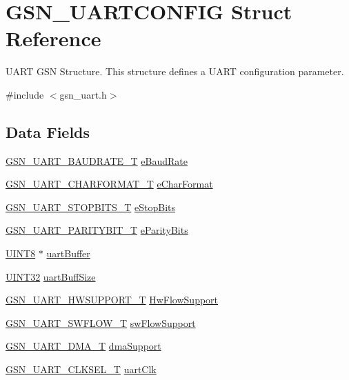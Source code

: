 \hypertarget{a00268}{
\section{GSN\_\-UARTCONFIG Struct Reference}
\label{a00268}
}


UART GSN Structure. This structure defines a UART configuration parameter.  




{\ttfamily \#include $<$gsn\_\-uart.h$>$}

\subsection*{Data Fields}
\begin{DoxyCompactItemize}
\item 
\hyperlink{a00656_ga867d009d402b5b0186abe5307715b9fc}{GSN\_\-UART\_\-BAUDRATE\_\-T} \hyperlink{a00268_acdfb4b214b0eddcf1abc92316a1ed6d1}{eBaudRate}
\item 
\hyperlink{a00656_gaf208b91b10fde1d137e4ec8a7dde641b}{GSN\_\-UART\_\-CHARFORMAT\_\-T} \hyperlink{a00268_a29549d5b2f7fbee09dd3f8b0c5632ebc}{eCharFormat}
\item 
\hyperlink{a00656_gad24814e9f0d44d09137d1984c23155c1}{GSN\_\-UART\_\-STOPBITS\_\-T} \hyperlink{a00268_a37d63083498fa8783003046b90f04949}{eStopBits}
\item 
\hyperlink{a00656_ga62f12eb4660a18fb77ba09b0625d0c8e}{GSN\_\-UART\_\-PARITYBIT\_\-T} \hyperlink{a00268_ad502004530cedf0657a430de1786d925}{eParityBits}
\item 
\hyperlink{a00660_gab27e9918b538ce9d8ca692479b375b6a}{UINT8} $\ast$ \hyperlink{a00268_abf2bee2b895436869a2c195cd903b51c}{uartBuffer}
\item 
\hyperlink{a00660_gae1e6edbbc26d6fbc71a90190d0266018}{UINT32} \hyperlink{a00268_a7b40e36ac25003b4d00941ab3f8a263a}{uartBuffSize}
\item 
\hyperlink{a00656_gaf4df97392dfefed655a81fe500a74162}{GSN\_\-UART\_\-HWSUPPORT\_\-T} \hyperlink{a00268_afcdcf525c04f0b05dabb1816248b6bd9}{HwFlowSupport}
\item 
\hyperlink{a00656_gae4fa00cd25fb7d023d1016b79b520542}{GSN\_\-UART\_\-SWFLOW\_\-T} \hyperlink{a00268_aeb73ed49d5b7594525fafe0f0ff0590f}{swFlowSupport}
\item 
\hyperlink{a00656_gafc3ee1b15b6b7039d697e48cabeba7de}{GSN\_\-UART\_\-DMA\_\-T} \hyperlink{a00268_a528c61545e39ea28f9a468044a298376}{dmaSupport}
\item 
\hyperlink{a00656_ga615bd92bf0cbe48e5b0502e97a57b0a5}{GSN\_\-UART\_\-CLKSEL\_\-T} \hyperlink{a00268_a42490982adbb99ac6d116705b7d36408}{uartClk}
\end{DoxyCompactItemize}


